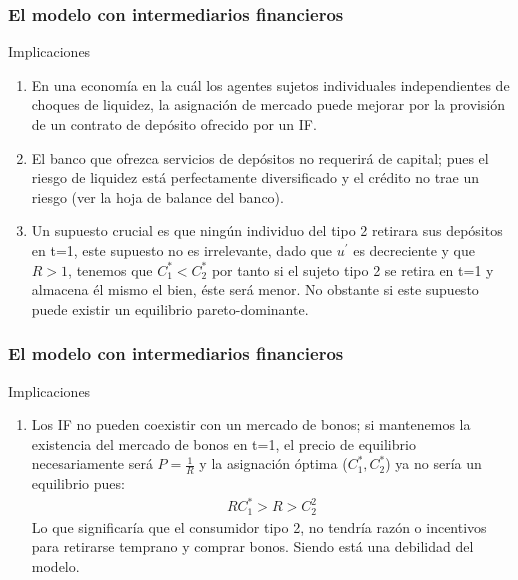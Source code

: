 \documentclass[10pt, xcolor=table, x11names]{beamer}
\begin{document}
\begin{frame}
    \frametitle{{\normalsize El modelo con intermediarios financieros } {}}
    
    \begin{block} {Implicaciones}
       \begin{enumerate}
           \item En una economía en la cuál los agentes sujetos individuales independientes de choques de liquidez, la asignación de mercado puede mejorar por la provisión de un contrato de depósito ofrecido por un IF.
           \item El banco que ofrezca servicios de depósitos no requerirá de capital; pues el riesgo de liquidez está perfectamente diversificado y el crédito no trae un riesgo (ver la hoja de balance del banco).
           \item Un supuesto crucial es que ningún individuo del tipo 2 retirara sus depósitos en t=1, este supuesto no es irrelevante, dado que $u^{'}$ es decreciente y que $R>1$, tenemos que $C_{1}^{*}<C_{2}^{*}$ por tanto si el sujeto tipo 2 se retira en t=1 y almacena él mismo el bien, éste será menor. No obstante si este supuesto puede existir un equilibrio pareto-dominante.
        \setcounter{enumTemp}{\theenumi}   
       \end{enumerate}
      
    \end{block}	
    
\end{frame}

\begin{frame}
    \frametitle{{\normalsize El modelo con intermediarios financieros } {}}
    
    \begin{block} {Implicaciones}
        \begin{enumerate}
            \setcounter{enumi}{\theenumTemp}
            \item Los IF no pueden coexistir con un mercado de bonos; si mantenemos la existencia del mercado de bonos en t=1, el precio de equilibrio necesariamente será $P=\frac{1}{R}$ y la asignación óptima ($C_{1}^{*}, C_{2}^{*}$)  ya no sería un equilibrio pues:
            \begin{align}
            RC_{1}^{*}>R>C_{2}^{2}\nonumber 
            \end{align}
            Lo que significaría que el consumidor tipo 2, no tendría razón o incentivos para retirarse temprano y comprar bonos. Siendo está una debilidad del modelo. 
        \end{enumerate}
        
    \end{block}	
    
\end{frame}
\end{document}
